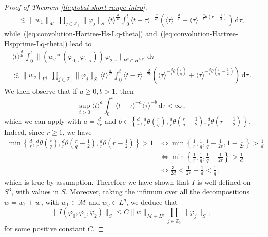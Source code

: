 \documentclass[12pt]{article}
\theoremstyle{plain}
\newcommand{\meas}{\mathcal{M}}
\begin{document}
\begin{proof}[Proof of Theorem \ref{th:global-short-range-intro}]
\begin{multline*}
\lesssim\|w_{1}\|_{\meas}\,\prod_{j\in\mathbb{Z}_{3}}\|\varphi_{j}\|_{S}\,\langle t\rangle^{\frac{d}{2r}}\int_{0}^{t}\langle t-\tau\rangle^{-\frac{d}{2r}}\left(\langle\tau\rangle^{-\frac{d}{r}}+\langle\tau\rangle^{-\frac{d}{r}\theta(r-\frac{1}{2})}\right)\,\mathrm{d}\tau,
\end{multline*}
while~(\ref{eq:convolution-Hartree-Hs-Lq-theta})
and~(\ref{eq:convolution-Hartree-Hspprime-Lq-theta}) lead to
\begin{multline*}
\langle t\rangle^{\frac{d}{2r}}\int_{0}^{t}\|(w_{q}*(\varphi_{0,\tau}\varphi_{1,\tau}))\,\varphi_{2,\tau}\|_{H^{s}\cap H^{s,p'}}\mathrm{d}\tau\\
\lesssim\|w_{q}\|_{L^{q}}\,\prod_{j\in\mathbb{Z}_{3}}\|\varphi_{j}\|_{S}\,\langle t\rangle^{\frac{d}{2r}}\int_{0}^{t}\langle t-\tau\rangle^{-\frac{d}{2r}}\left(\langle\tau\rangle^{-\frac{d}{r}\theta(\frac{r}{q})}+\langle\tau\rangle^{-\frac{d}{r}\theta(\frac{r}{q}-\frac{1}{2})}\right)\,\mathrm{d}\tau\,.
\end{multline*}
We then observe that if $a\geq0,b>1$, then 
\begin{equation}
\sup_{t>0}\langle t\rangle^{a}\int_{0}^{t}\langle t-\tau\rangle^{-a}\langle\tau\rangle^{-b}\,\mathrm{d}\tau<\infty\,,\label{eq:integrale-finie}
\end{equation}
which we can apply with $a=\frac{d}{2r}$ and $b\in\left\{\frac dr, \frac{d}{r}\theta(\frac{r}{q}),\frac{d}{r}\theta(\frac{r}{q}-\frac{1}{2}),\frac{d}{r}\theta(r-\frac{1}{2})\right\} $.
Indeed, since $r\geq1$, we have
\begin{align*}
\min\left\{\frac dr, \frac{d}{r}\theta(\frac{r}{q}),\frac{d}{r}\theta(\frac{r}{q}-\frac{1}{2}),\frac{d}{r}\theta(r-\frac{1}{2})\right\} >1 & \Leftrightarrow\min\left\{ \frac{1}{r},\frac{1}{q},\frac{1}{q}-\frac{1}{2r},1-\frac{1}{2r}\right\} >\frac{1}{d}\\
 & \Leftrightarrow\min\left\{ \frac{1}{r},\frac{1}{q},\frac{1}{q}-\frac{1}{2r}\right\} >\frac{1}{d}\\
 & \Leftrightarrow\frac{3}{2d}<\frac{1}{2r}+\frac{1}{d}<\frac{1}{q}\,,
\end{align*}
which is true by assumption. Therefore we have shown that $I$ is well-defined on $S^{3}$, with values in $S$. Moreover, taking the infimum over all the decompositions $w=w_1+w_q$ with $w_1\in\meas $ and $w_q\in L^q$, we deduce that 
\begin{equation}
\|I(\varphi_{0},\varphi_{1},\varphi_{2})\|_{S}\leq C\|w\|_{\meas+L^{q}}\prod_{j\in\mathbb{Z}_{3}}\|\varphi_{j}\|_{S}\,,\label{eq:borne-integrale-trilineaire}
\end{equation}
for some positive constant $C$.


\end{proof}
\end{document}
